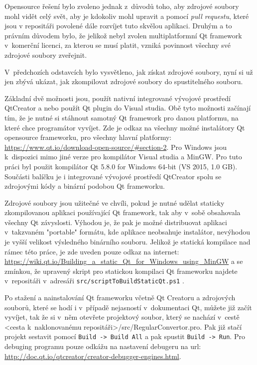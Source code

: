 Opensource řešení bylo zvoleno jednak z~důvodů toho, aby zdrojové soubory mohl vidět celý svět, aby je kdokoliv mohl upravit a pomocí \textit{pull requestu}, které jsou v repositáři povolené dále rozvíjet tuto skvělou aplikaci. Druhým a to právním důvodem bylo, že jelikož nebyl zvolen multiplatformní Qt framework v~komerční licenci, za kterou se musí platit, vzniká povinnost všechny své zdrojové soubory zveřejnit.

V~předchozích odstavcích bylo vysvětleno, jak získat zdrojové soubory, nyní si už jen zbývá ukázat, jak zkompilovat zdrojové soubory do spustitelného souboru. 

Základní dvě možnosti jsou, použít nativní integrované vývojové prostředí QtCreator a nebo použít Qt plugin do Visual studia. Obě tyto možnosti začínají tím, že je nutné si stáhnout samotný Qt framework pro danou platformu, na které chce programátor vyvíjet. Zde je odkaz na všechny možné instalátory Qt opensource frameworku, pro všechny hlavní platformy: \url{https://www.qt.io/download-open-source/#section-2}. Pro Windows jsou k~dispozici mimo jiné verze pro kompilátor Visual studia a MinGW. Pro tuto práci byl použit kompilátor Qt 5.8.0 for Windows 64-bit (VS 2015, 1.0 GB). Součásti balíčku je i integrované vývojové prostředí QtCreator spolu se zdrojovými kódy a binární podobou Qt frameworku. 

Zdrojové soubory jsou užitečné ve chvíli, pokud je nutné udělat staticky zkompilovanou aplikaci používající Qt framework, tak aby v~sobě obsahovala všechny Qt závyslosti. Výhodou je, že pak je možné distribuovat aplikaci v~takzvaném "portable" formátu, kde aplikace neobsahuje instalátor, nevýhodou je vyšší velikost výsledného binárního souboru. Jelikož je statická kompilace nad rámec této práce, je zde uveden pouze odkaz na internet: \url{https://wiki.qt.io/Building_a_static_Qt_for_Windows_using_MinGW} a se zmínkou, že upravený skript pro statickou kompilaci Qt frameworku najdete v~repositáři v~adresáři \texttt{src/scriptToBuildStaticQt.ps1} .

Po stažení a nainstalování Qt frameworku včetně Qt Creatoru a zdrojových souborů, které se hodí i v~případě nejasností v~dokumentaci Qt, můžete již začít vyvíjet, tak že si v~něm otevřete projektový soubor, který se nachází v~cestě <cesta k~naklonovanému repositáři>/src/RegularConvertor.pro. Pak již stačí projekt sestavit pomocí \texttt{Build -> Build All} a pak spustit \texttt{Build -> Run}. Pro debuging programu pouze odkážu na nastavení debugeru na url: \url{http://doc.qt.io/qtcreator/creator-debugger-engines.html}.   

